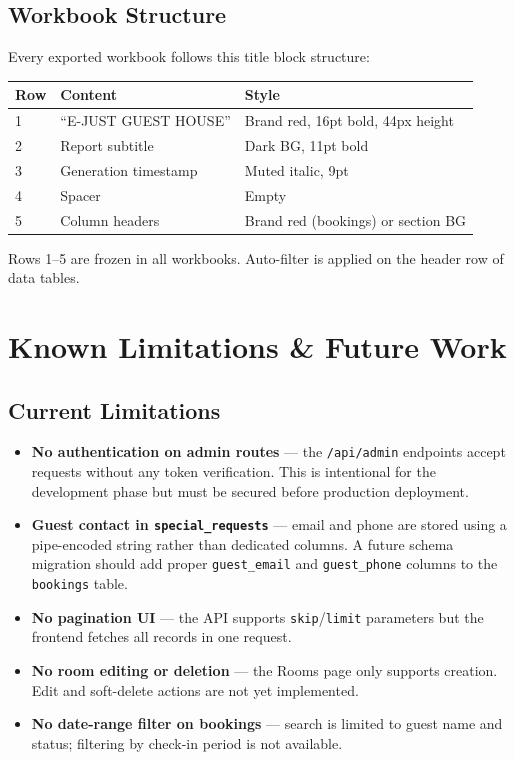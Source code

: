 \documentclass[12pt,a4paper]{report}
\begin{document}
\section{Workbook Structure}

Every exported workbook follows this title block structure:

\begin{center}
\begin{tabular}{lll}
  \toprule
  \textbf{Row} & \textbf{Content} & \textbf{Style} \\
  \midrule
  1 & ``E-JUST GUEST HOUSE'' & Brand red, 16pt bold, 44px height \\
  2 & Report subtitle         & Dark BG, 11pt bold \\
  3 & Generation timestamp    & Muted italic, 9pt \\
  4 & Spacer                  & Empty \\
  5 & Column headers          & Brand red (bookings) or section BG \\
  \bottomrule
\end{tabular}
\end{center}

Rows 1–5 are frozen in all workbooks. Auto-filter is applied on the header
row of data tables.

\chapter{Known Limitations \& Future Work}

\section{Current Limitations}

\begin{itemize}[leftmargin=2em]
  \item \textbf{No authentication on admin routes} — the
        \texttt{/api/admin} endpoints accept requests without any token
        verification. This is intentional for the development phase but
        must be secured before production deployment.
  \item \textbf{Guest contact in \texttt{special\_requests}} — email and phone
        are stored using a pipe-encoded string rather than dedicated columns.
        A future schema migration should add proper \texttt{guest\_email} and
        \texttt{guest\_phone} columns to the \texttt{bookings} table.
  \item \textbf{No pagination UI} — the API supports \texttt{skip}/\texttt{limit}
        parameters but the frontend fetches all records in one request.
  \item \textbf{No room editing or deletion} — the Rooms page only supports
        creation. Edit and soft-delete actions are not yet implemented.
  \item \textbf{No date-range filter on bookings} — search is limited to guest
        name and status; filtering by check-in period is not available.
\end{itemize}
\end{document}
